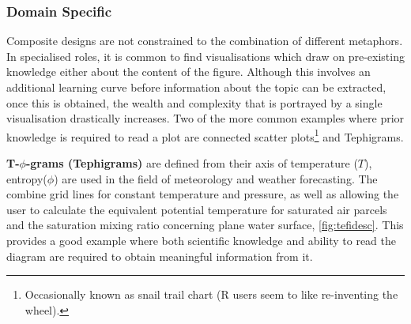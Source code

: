 \subsubsection{Domain Specific}




Composite designs are not constrained to the combination of different metaphors. In specialised roles, it is common to find visualisations which draw on pre-existing knowledge either about the content of the figure. Although this involves an additional learning curve before information about the topic can be extracted, once this is obtained, the wealth and complexity that is portrayed by a single visualisation drastically increases. Two of the more common examples where prior knowledge is required to read a plot are connected scatter plots\footnote{ Occasionally known as snail trail chart (R users seem to like re-inventing the wheel). } and Tephigrams.

\textbf{T-$\phi$-grams (Tephigrams)} are defined from their axis of temperature ($T$), entropy($\phi$) are used in the field of meteorology and weather forecasting. The combine grid lines for constant temperature and pressure, as well as allowing the user to calculate the equivalent potential temperature for saturated air parcels and the saturation mixing ratio concerning plane water surface, \autoref{fig:tefidesc}. This provides a good example where both scientific knowledge and ability to read the diagram are required to obtain meaningful information from it.

